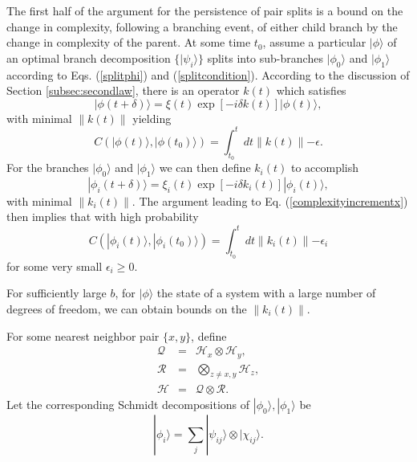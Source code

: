 \documentclass[12pt,amsmath,amssymb,onecolumn]{revtex4-2}
\begin{document}
The first half of the argument for the persistence
of pair splits is a bound on the change
in complexity, following a branching event, of either child branch 
by the change in complexity of the parent.
At some time $t_0$, assume a particular $|\phi \rangle $ of an optimal branch decomposition $\{|\psi_i \rangle \}$
splits into sub-branches $|\phi_0 \rangle $ and $|\phi_1 \rangle $ according to  Eqs. (\ref{splitphi}) and (\ref{splitcondition}).
According to the discussion of Section \ref{subsec:secondlaw},
there is an operator $k(t)$ which 
satisfies
\begin{equation}
  \label{incrementalkx}
  |\phi( t + \delta) \rangle  = \xi(t) \exp[ -i \delta k(t)] |\phi(t) \rangle, 
\end{equation}
with minimal $\parallel k(t) \parallel$
yielding
\begin{equation}
  \label{complexityincrementx}
  C( |\phi(t) \rangle , |\phi(t_0) \rangle ) = \int_{t_0}^t dt \parallel k(t) \parallel - \epsilon .
\end{equation}
For the branches $|\phi_0 \rangle $ and $|\phi_1 \rangle $ we can
then define $k_i(t)$ to accomplish
\begin{equation}
  \label{incrementalki}
  |\phi_i( t + \delta) \rangle  = \xi_i(t) \exp[ -i \delta k_i(t)] |\phi_i(t) \rangle , 
\end{equation}
with minimal $\parallel k_i(t) \parallel$.
The argument leading to Eq. (\ref{complexityincrementx})
then implies that with high probability
\begin{equation}
  \label{complexityincrement3}
  C( |\phi_i(t) \rangle , |\phi_i(t_0) \rangle ) = \int_{t_0}^t dt \parallel k_i(t) \parallel - \epsilon_i
\end{equation}
for some very small $\epsilon_i \ge 0$.


For sufficiently large $b$, for $|\phi \rangle $ the state of a system
with a large number of degrees of freedom,
we can obtain bounds on the $\parallel k_i(t) \parallel$.

For some nearest neighbor pair $\{x, y\}$, define
\begin{subequations}
  \begin{eqnarray}
    \label{defQ1}
    \mathcal{Q} & = & \mathcal{H}_x \otimes \mathcal{H}_y, \\
    \label{defR}
    \mathcal{R} & = & \bigotimes_{z \ne x, y} \mathcal{H}_z, \\
    \label{defQR}
    \mathcal{H} & = & \mathcal{Q} \otimes \mathcal{R}.
  \end{eqnarray}
\end{subequations}
Let the corresponding Schmidt decompositions of $|\phi_0 \rangle , |\phi_1 \rangle $ be
\begin{equation}
  \label{defpsixhi}
  |\phi_i \rangle  = \sum_j  |\psi_{ij} \rangle  \otimes |\chi_{ij} \rangle .
\end{equation}
\end{document}
